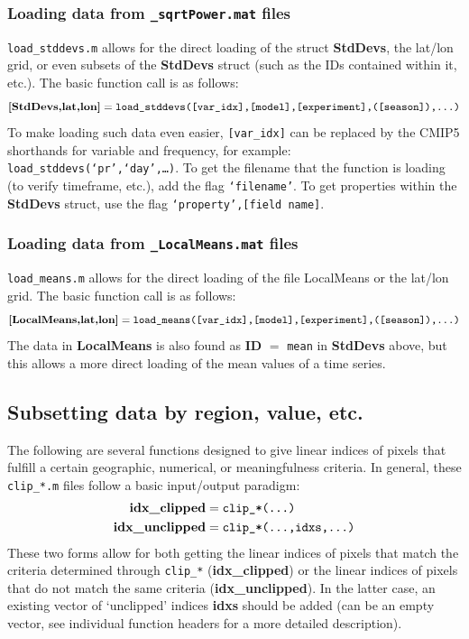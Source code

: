 \documentclass{article}
\begin{document}
\subsubsection{Loading data from \texttt{\_sqrtPower.mat} files}
\texttt{load\_stddevs.m} allows for the direct loading of the struct \textbf{StdDevs}, the lat/lon grid, or even subsets of the \textbf{StdDevs} struct (such as the IDs contained within it, etc.). The basic function call is as follows:
\begin{equation}
\textbf{[StdDevs,lat,lon]} = \texttt{load\_stddevs([var\_idx],[model],[experiment],([season]),\dots)}
\end{equation}
To make loading such data even easier, \texttt{[var\_idx]} can be replaced by the CMIP5 shorthands for variable and frequency, for example: \texttt{load\_stddevs(`pr',`day',\dots)}. To get the filename that the function is loading (to verify timeframe, etc.), add the flag \texttt{`filename'}. To get properties within the \textbf{StdDevs} struct, use the flag \texttt{`property',[field name]}. 

\subsubsection{Loading data from \texttt{\_LocalMeans.mat} files}
\texttt{load\_means.m} allows for the direct loading of the file LocalMeans or the lat/lon grid. The basic function call is as follows:
\begin{equation}
\textbf{[LocalMeans,lat,lon]} = \texttt{load\_means([var\_idx],[model],[experiment],([season]),\dots)}
\end{equation}
The data in \textbf{LocalMeans} is also found as \textbf{ID} $=$ \texttt{mean} in \textbf{StdDevs} above, but this allows a more direct loading of the mean values of a time series. 

\subsection{Subsetting data by region, value, etc.}
The following are several functions designed to give linear indices of pixels that fulfill a certain geographic, numerical, or meaningfulness criteria. In general, these \texttt{clip\_*.m} files follow a basic input/output paradigm:
\begin{equation}
\begin{aligned}
\textbf{idx\_clipped} &= \texttt{clip\_*(\dots)} \\
\textbf{idx\_unclipped} &= \texttt{clip\_*(\dots,idxs,\dots)}
\end{aligned}
\end{equation}
These two forms allow for both getting the linear indices of pixels that match the criteria determined through \texttt{clip\_*} (\textbf{idx\_clipped}) or the linear indices of pixels that do not match the same criteria (\textbf{idx\_unclipped}). In the latter case, an existing vector of `unclipped' indices \textbf{idxs} should be added (can be an empty vector, see individual function headers for a more detailed description). 
\end{document}
